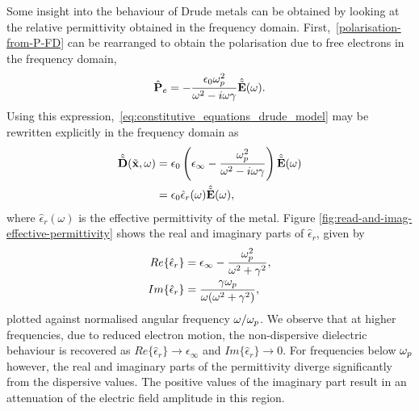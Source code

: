 Some insight into the behaviour of Drude metals can be obtained by looking at the relative permittivity obtained in the frequency domain. First,~\eqref{polarisation-from-P-FD} can be rearranged to obtain the polarisation due to free electrons in the frequency domain,
\begin{equation}
\hat{\mathbf{P}}_e = - \frac{\epsilon_0 \omega_p^2}{\omega^2 - i \omega \gamma } \hat{\tilde{\mathbf{E}}}(\omega) .
  \label{eq:polarization-field-freq-domain}
\end{equation}
Using this expression,~\eqref{eq:constitutive_equations_drude_model} may be rewritten explicitly in the frequency domain as
\begin{equation}
    \begin{split}
    \hat{\tilde{\mathbf{D}}}(\tilde{\mathbf{x}},\omega) &= \epsilon_0 \left( \epsilon_{\infty} - \frac{\omega_p^2 }{\omega^2 - i \omega \gamma } \right) \hat{\tilde{\mathbf{E}}}(\omega) \\
                                        &= \epsilon_0 \hat{\epsilon}_r (\omega) \hat{\tilde{\mathbf{E}}}(\omega) ,
    \end{split}
\end{equation}
where $\hat{\epsilon}_r(\omega)$ is the effective permittivity of the metal. Figure \ref{fig:read-and-imag-effective-permittivity} shows the real and imaginary parts of $\hat{\epsilon}_r$, given by
\begin{subequations}
\begin{align}
    Re\{ \hat{\epsilon}_r \} &= \epsilon_{\infty} - \frac{\omega_p^2}{\omega^2 + \gamma^2}, \\
    Im\{ \hat{\epsilon}_r \} &= \frac{\gamma \omega_p}{\omega ( \omega^2 + \gamma^2) } ,
\end{align}
\end{subequations}
plotted against normalised angular frequency $\omega / \omega_p$. We observe that at higher frequencies, due to reduced electron motion, the non-dispersive dielectric behaviour is recovered as $Re\{\hat{\epsilon}_r\} \to \epsilon_{\infty}$ and $Im\{\hat{\epsilon}_r\} \to 0$. For frequencies below $\omega_p$ however, the real and imaginary parts of the permittivity diverge significantly from the dispersive values. The positive values of the imaginary part result in an attenuation of the electric field amplitude in this region.


